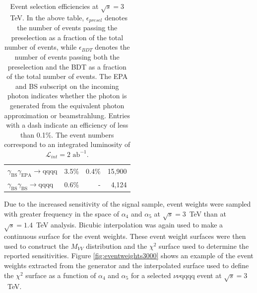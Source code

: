 \begin{table}[h!]
\begin{tabular}{ l r r r }
$\gamma_{\text{BS}}\gamma_{\text{EPA}} \rightarrow \text{qqqq}$ & 3.5\% & 0.4\% & 15,900 \\
$\gamma_{\text{BS}}\gamma_{\text{BS}} \rightarrow \text{qqqq}$ & 0.6\% & - & 4,124 \\
\hline
\end{tabular}
\caption[Event selection efficiencies at $\sqrt{s}=3$~TeV.  In the above table, $\epsilon_{presel}$ denotes the number of events passing the preselection as a fraction of the total number of events, while $\epsilon_{BDT}$ denotes the number of events passing both the preselection and the BDT as a fraction of the total number of events.  The EPA and BS subscript on the incoming photon indicates whether the photon is generated from the equivalent photon approximation or beamstrahlung.  Entries with a dash indicate an efficiency of less than 0.1\%.  The event numbers correspond to an integrated luminosity of $\mathcal{L}_{int} = 2\text{ ab}^{-1}$.]{Event selection efficiencies at $\sqrt{s}=3$~TeV.  In the above table, $\epsilon_{presel}$ denotes the number of events passing the preselection as a fraction of the total number of events, while $\epsilon_{BDT}$ denotes the number of events passing both the preselection and the BDT as a fraction of the total number of events.  The EPA and BS subscript on the incoming photon indicates whether the photon is generated from the equivalent photon approximation or beamstrahlung.  Entries with a dash indicate an efficiency of less than 0.1\%.  The event numbers correspond to an integrated luminosity of $\mathcal{L}_{int} = 2\text{ ab}^{-1}$.}
\label{table:selectionsummary3000GeV}
\end{table}

Due to the increased sensitivity of the signal sample, event weights were sampled with greater frequency in the space of $\alpha_{4}$ and $\alpha_{5}$ at $\sqrt{s}=3$~TeV than at $\sqrt{s}=1.4$~TeV analysis.  Bicubic interpolation was again used to make a continuous surface for the event weights.  These event weight surfaces were then used to construct the $M_{VV}$ distribution and the $\chi^{2}$ surface used to determine the reported sensitivities.  Figure \ref{fig:eventweights3000} shows an example of the event weights extracted from the generator and the interpolated surface used to define the $\chi^{2}$ surface as a function of $\alpha_{4}$ and $\alpha_{5}$ for a selected $\nu\nu\text{qqqq}$ event at $\sqrt{s}=3$~TeV.

